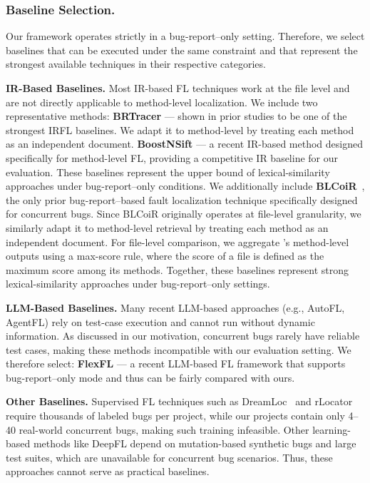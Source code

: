 


\subsubsection{Baseline Selection.}

Our framework operates strictly in a bug-report–only setting. Therefore, we select baselines that can be executed under the same constraint and that represent the strongest available techniques in their respective categories.

\noindent
\textbf{IR-Based Baselines.}
Most IR-based FL techniques work at the file level and are not directly applicable to method-level localization. We include two representative methods: \textbf{BRTracer} \cite{BTrace} — shown in prior studies \cite{shao2024enhancing, lee2018bench4bl} to be one of the strongest IRFL baselines. We adapt it to method-level by treating each method as an independent document. \textbf{BoostNSift} \cite{razzaq2021boostnsift} — a recent IR-based method designed specifically for method-level FL, providing a competitive IR baseline for our evaluation. These baselines represent the upper bound of lexical-similarity approaches under bug-report–only conditions. We additionally include \textbf{BLCoiR}~\cite{shao2023information}, the only prior bug-report–based fault localization technique specifically designed for concurrent bugs. Since BLCoiR originally operates at file-level granularity, we similarly adapt it to method-level retrieval by treating each method as an independent document. For file-level comparison, we aggregate \Name{}'s method-level outputs using a max-score rule, where the score of a file is defined as the maximum score among its methods. Together, these baselines represent strong lexical-similarity approaches under bug-report–only settings.


\noindent
\textbf{LLM-Based Baselines.}
Many recent LLM-based approaches (e.g., AutoFL, AgentFL) rely on test-case execution and cannot run without dynamic information. As discussed in our motivation, concurrent bugs rarely have reliable test cases, making these methods incompatible with our evaluation setting.
We therefore select: \textbf{FlexFL} — a recent LLM-based FL framework that supports bug-report–only mode and thus can be fairly compared with ours.

\noindent
\textbf{Other Baselines.}
Supervised FL techniques such as DreamLoc~\cite{dreamloc} and rLocator~\cite{locator} require thousands of labeled bugs per project, while our projects contain only 4–40 real-world concurrent bugs, making such training infeasible.
Other learning-based methods like DeepFL depend on mutation-based synthetic bugs and large test suites, which are unavailable for concurrent bug scenarios. Thus, these approaches cannot serve as practical baselines.

